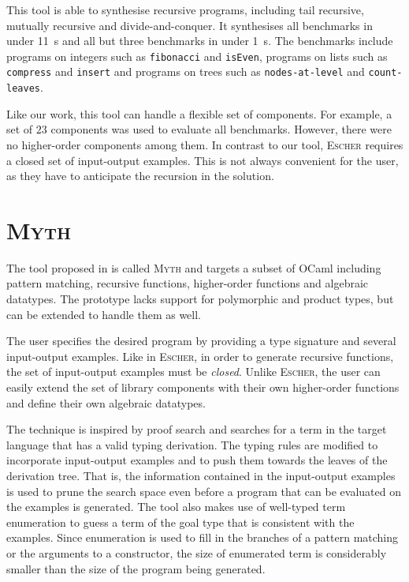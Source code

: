 This tool is able to synthesise recursive programs, including tail recursive, mutually recursive and divide-and-conquer. It synthesises all benchmarks in under \SI{11}{s} and all but three benchmarks in under \SI{1}{s}. The benchmarks include programs on integers such as \lstinline!fibonacci! and \lstinline!isEven!, programs on lists such as \lstinline!compress! and \lstinline!insert! and programs on trees such as \lstinline!nodes-at-level! and \lstinline!count-leaves!.

Like our work, this tool can handle a flexible set of components. For example, a set of $23$ components was used to evaluate all benchmarks. However, there were no higher-order components among them. In contrast to our tool, \textsc{Escher} requires a closed set of input-output examples. This is not always convenient for the user, as they have to anticipate the recursion in the solution.

\section{\mdseries\textsc{Myth}}

The tool proposed in \cite{MythPaper} is called \textsc{Myth} and targets a subset of OCaml including pattern matching, recursive functions, higher-order functions and algebraic datatypes. The prototype lacks support for polymorphic and product types, but can be extended to handle them as well.

The user specifies the desired program by providing a type signature and several input-output examples. Like in \textsc{Escher}, in order to generate recursive functions, the set of input-output examples must be \emph{closed}. Unlike \textsc{Escher}, the user can easily extend the set of library components with their own higher-order functions and define their own algebraic datatypes.

The technique is inspired by proof search and searches for a term in the target language that has a valid typing derivation. The typing rules are modified to incorporate input-output examples and to push them towards the leaves of the derivation tree. That is, the information contained in the input-output examples is used to prune the search space even before a program that can be evaluated on the examples is generated. The tool also makes use of well-typed term enumeration to guess a term of the goal type that is consistent with the examples. Since enumeration is used to fill in the branches of a pattern matching or the arguments to a constructor, the size of enumerated term is considerably smaller than the size of the program being generated.

